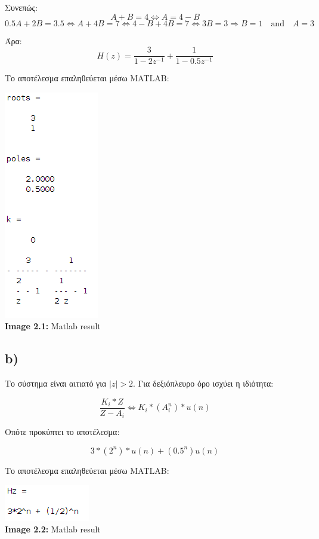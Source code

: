 \documentclass[11pt]{article}
\begin{document}
\par \noindent
Συνεπώς:
\[ A+B=4 \Leftrightarrow A=4-B \]
\[ 0.5A+2B=3.5 \Leftrightarrow  A+4B=7 \Leftrightarrow  4-B+4B=7 \Leftrightarrow  3B=3 \Rightarrow  B=1 \quad \textrm{and} \quad  A=3 \]

\par \noindent
Άρα:
$$H(z) =\frac{3}{1-2z^{-1}} + \frac{1}{1-0.5z^{-1}} $$ 

\par \noindent
Το αποτέλεσμα επαληθεύεται μέσω MATLAB:
\begin{center}{}
    \includegraphics[scale=0.6]{photos/roots_poles_k.png} \\
    \textbf{Image 2.1:} Matlab result 
\end{center}

\subsection*{b)}
Το σύστημα είναι αιτιατό για $|z| > 2$.
Για δεξιόπλευρο όρο ισχύει η ιδιότητα:

\[
       \frac{K_i*Z}{Z-A_i} \Longleftrightarrow K_i*(A_i^n)*u(n)
\] 

\par \noindent
Οπότε προκύπτει το αποτέλεσμα:

\[
    3*(2^n)*u(n) + (0.5^n)u(n)
\] 

\par \noindent
Το αποτέλεσμα επαληθεύεται μέσω MATLAB:

\begin{center}{}
    \includegraphics[scale=0.7]{photos/H_z.png} \\
    \textbf{Image 2.2:} Matlab result 
\end{center}
\end{document}
